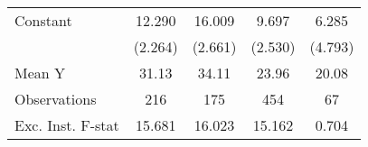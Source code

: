 {\begin{tabular}{l*{4}{c}}
\addlinespace
Constant            &      12.290\sym{***}&      16.009\sym{***}&       9.697\sym{***}&       6.285         \\
                    &     (2.264)         &     (2.661)         &     (2.530)         &     (4.793)         \\
\midrule
Mean Y              &       31.13         &       34.11         &       23.96         &       20.08         \\
Observations        &         216         &         175         &         454         &          67         \\
Exc. Inst. F-stat   &      15.681         &      16.023         &      15.162         &       0.704         \\
\bottomrule
\end{tabular}
}

